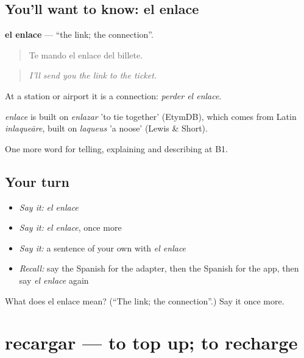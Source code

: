 \subsection*{You'll want to know: el enlace}
\textbf{el enlace} — \textquotedblleft{}the link; the connection\textquotedblright{}.

\begin{quote}
Te mando el enlace del billete.
\end{quote}

\begin{quote}
\emph{I'll send you the link to the ticket.}
\end{quote}

At a station or airport it is a connection: \emph{perder el enlace}.

\begin{cousinweb}
\emph{enlace} is built on \emph{enlazar} 'to tie together' (EtymDB), which comes from Latin \emph{inlaqueāre}, built on \emph{laqueus} 'a noose' (Lewis \& Short).
\end{cousinweb}

\begin{grammarlens}[title={What you've built}]
One more word for telling, explaining and describing at B1.
\end{grammarlens}

\subsection*{Your turn}
\begin{itemize}
\raggedright
  \item \emph{Say it:} \emph{el enlace}
  \item \emph{Say it:} \emph{el enlace}, once more
  \item \emph{Say it:} a sentence of your own with \emph{el enlace}
  \item \emph{Recall:} say the Spanish for the adapter, then the Spanish for the app, then say \emph{el enlace} again
\end{itemize}

\begin{tcolorbox}[breakable,colback=teal!4,colframe=teal!35!black,title={Before you move on}]
What does el enlace mean? (\textquotedblleft{}The link; the connection\textquotedblright{}.) Say it once more.
\end{tcolorbox}
\section[recargar]{recargar — to top up; to recharge}

